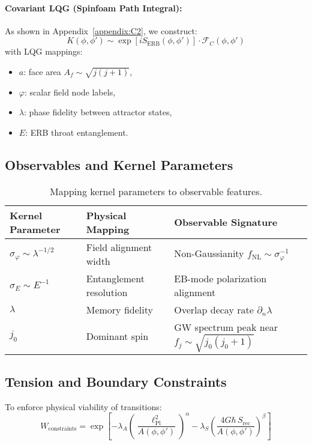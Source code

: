 \paragraph{Covariant LQG (Spinfoam Path Integral):}
As shown in Appendix~\ref{appendix:C2}, we construct:
\[
K(\phi, \phi') \sim \exp\left[i S_{\text{ERB}}(\phi, \phi')\right] \cdot \mathcal{F}_C(\phi, \phi')
\]
with LQG mappings:
\begin{itemize}
    \item \( a \): face area \( A_f \sim \sqrt{j(j+1)} \),
    \item \( \varphi \): scalar field node labels,
    \item \( \lambda \): phase fidelity between attractor states,
    \item \( E \): ERB throat entanglement.
\end{itemize}

\subsection{Observables and Kernel Parameters}
\label{subsec:observables-and-kernel-parameters}

\begin{table}[H]
\centering
\begin{tabular}{lll}
\toprule
\textbf{Kernel Parameter} & \textbf{Physical Mapping} & \textbf{Observable Signature} \\
\midrule
\( \sigma_\varphi \sim \lambda^{-1/2} \) & Field alignment width & Non-Gaussianity \( f_{\text{NL}} \sim \sigma_\varphi^{-1} \) \\
\( \sigma_E \sim E^{-1} \) & Entanglement resolution & EB-mode polarization alignment \\
\( \lambda \) & Memory fidelity & Overlap decay rate \( \partial_n \lambda \) \\
\( j_0 \) & Dominant spin & GW spectrum peak near \( f_j \sim \sqrt{j_0(j_0+1)} \) \\
\bottomrule
\end{tabular}
\caption{Mapping kernel parameters to observable features.}
\end{table}

\subsection{Tension and Boundary Constraints}
\label{subsec:tension-constraints}

To enforce physical viability of transitions:
\[
W_{\text{constraints}} = \exp\left[
    -\lambda_A\left(\frac{\ell_{\text{Pl}}^2}{A(\phi,\phi')}\right)^{\alpha} 
    - \lambda_S\left(\frac{4G\hbar\, S_{\text{rec}}}{A(\phi,\phi')}\right)^{\beta}
\right]
\]

